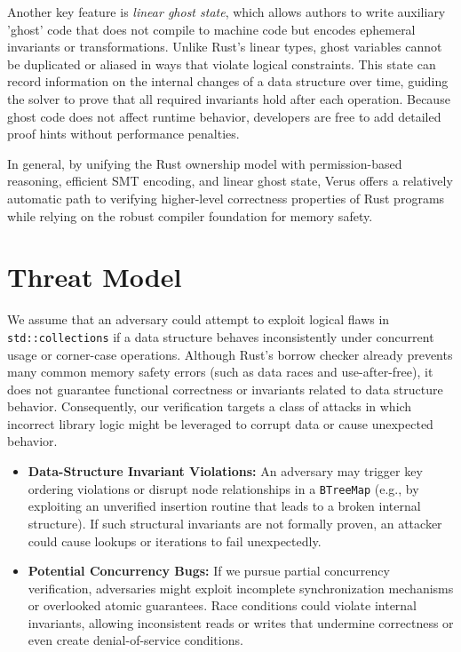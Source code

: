 \documentclass[conference]{IEEEtran}
\begin{document}
Another key feature is \emph{linear ghost state}, which allows authors to write auxiliary 'ghost' code that does not compile to machine code but encodes ephemeral invariants or transformations. Unlike Rust's linear types, ghost variables cannot be duplicated or aliased in ways that violate logical constraints. This state can record information on the internal changes of a data structure over time, guiding the solver to prove that all required invariants hold after each operation. Because ghost code does not affect runtime behavior, developers are free to add detailed proof hints without performance penalties.

In general, by unifying the Rust ownership model with permission-based reasoning, efficient SMT encoding, and linear ghost state, Verus offers a relatively automatic path to verifying higher-level correctness properties of Rust programs while relying on the robust compiler foundation for memory safety.




\section{Threat Model}

We assume that an adversary could attempt to exploit logical flaws in \texttt{std::collections} if a data structure behaves inconsistently under concurrent usage or corner-case operations. Although Rust's borrow checker already prevents many common memory safety errors (such as data races and use-after-free), it does not guarantee functional correctness or invariants related to data structure behavior. Consequently, our verification targets a class of attacks in which incorrect library logic might be leveraged to corrupt data or cause unexpected behavior.

\begin{itemize}
\item \textbf{Data-Structure Invariant Violations:} An adversary may trigger key ordering violations or disrupt node relationships in a \texttt{BTreeMap} (e.g., by exploiting an unverified insertion routine that leads to a broken internal structure). If such structural invariants are not formally proven, an attacker could cause lookups or iterations to fail unexpectedly.
\item \textbf{Potential Concurrency Bugs:} If we pursue partial concurrency verification, adversaries might exploit incomplete synchronization mechanisms or overlooked atomic guarantees. Race conditions could violate internal invariants, allowing inconsistent reads or writes that undermine correctness or even create denial-of-service conditions.
\end{itemize}
\end{document}
